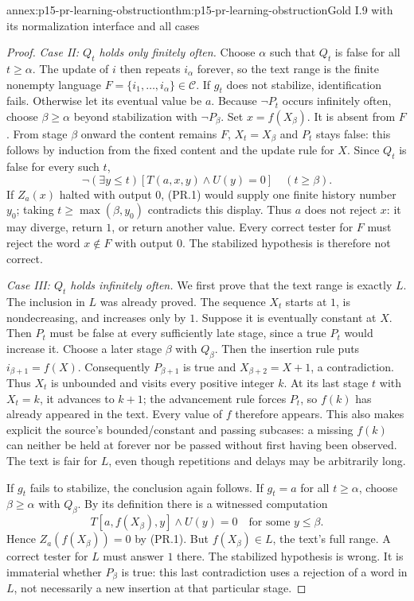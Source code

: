 \begin{annexitem}{annex:p15-pr-learning-obstruction}{thm:p15-pr-learning-obstruction}{Gold I.9 with its normalization interface and all cases}
\begin{proof}
\emph{Case II: \(Q_t\) holds only finitely often.}
Choose \(\alpha\) such that \(Q_t\) is false for
all \(t\geq\alpha\). The update of \(i\) then
repeats \(i_\alpha\) forever, so the text range
is the finite nonempty language
\(F=\{i_1,\ldots,i_\alpha\}\in\mathcal C\).
If \(g_t\) does not stabilize, identification fails.
Otherwise let its eventual value be \(a\).
Because \(\neg P_t\) occurs infinitely often,
choose \(\beta\geq\alpha\) beyond stabilization
with \(\neg P_\beta\). Set \(x=f(X_\beta)\).
It is absent from \(F\).
From stage \(\beta\) onward the content remains
\(F\), \(X_t=X_\beta\) and \(P_t\) stays false:
this follows by induction from the fixed content
and the update rule for \(X\).
Since \(Q_t\) is false for every such \(t\),
\[
 \neg(\exists y\leq t)
 [T(a,x,y)\land U(y)=0]\quad(t\geq\beta).
\]
If \(Z_a(x)\) halted with output \(0\), (PR.1)
would supply one finite history number \(y_0\);
taking \(t\geq\max(\beta,y_0)\) contradicts this
display. Thus \(a\) does not reject \(x\):
it may diverge, return \(1\), or return another value.
Every correct tester for \(F\) must reject
the word \(x\notin F\) with output \(0\).
The stabilized hypothesis is therefore not correct.

\emph{Case III: \(Q_t\) holds infinitely often.}
We first prove that the text range is exactly \(L\).
The inclusion in \(L\) was already proved.
The sequence \(X_t\) starts at \(1\), is nondecreasing,
and increases only by \(1\). Suppose it is eventually
constant at \(X\). Then \(P_t\) must be false
at every sufficiently late stage, since a true
\(P_t\) would increase it. Choose a later stage
\(\beta\) with \(Q_\beta\). Then the insertion
rule puts \(i_{\beta+1}=f(X)\).
Consequently \(P_{\beta+1}\) is true and
\(X_{\beta+2}=X+1\), a contradiction.
Thus \(X_t\) is unbounded and visits every positive
integer \(k\). At its last stage \(t\) with
\(X_t=k\), it advances to \(k+1\); the advancement
rule forces \(P_t\), so \(f(k)\) has already
appeared in the text. Every value of \(f\)
therefore appears. This also makes explicit the
source's bounded/constant and passing subcases:
a missing \(f(k)\) can neither be held at forever
nor be passed without first having been observed.
The text is fair for \(L\), even though repetitions
and delays may be arbitrarily long.

If \(g_t\) fails to stabilize, the conclusion
again follows. If \(g_t=a\) for all
\(t\geq\alpha\), choose \(\beta\geq\alpha\)
with \(Q_\beta\). By its definition there is
a witnessed computation
\[
 T[a,f(X_\beta),y]\land U(y)=0
 \quad\text{for some }y\leq\beta.
\]
Hence \(Z_a(f(X_\beta))=0\) by (PR.1).
But \(f(X_\beta)\in L\), the text's full range.
A correct tester for \(L\) must answer \(1\) there.
The stabilized hypothesis is wrong.
It is immaterial whether \(P_\beta\) is true:
this last contradiction uses a rejection of
a word in \(L\), not necessarily a new insertion
at that particular stage.


\end{proof}
\end{annexitem}
